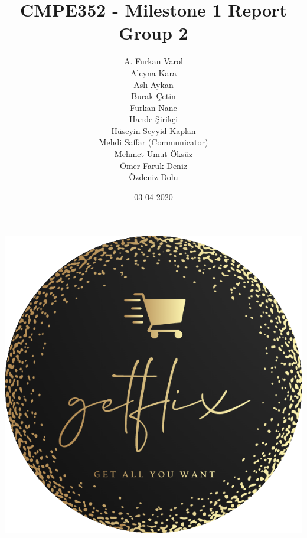 \documentclass[]{article}
\title{CMPE352 - Milestone 1 Report \\ Group 2}
\author{A. Furkan Varol \\ Aleyna Kara \\ Aslı Aykan
    \\ Burak Çetin \\ Furkan Nane \\ Hande Şirikçi
    \\ Hüseyin Seyyid Kaplan \\ Mehdi Saffar (Communicator) \\ Mehmet Umut Öksüz
    \\ Ömer Faruk Deniz \\ Özdeniz Dolu}
\date{03-04-2020}
\begin{document}
\makeatletter
\begin{titlepage}
    \begin{center}
        \includegraphics{logo_circle.png}\\[3ex] \leavevmode \\
        {\huge \bfseries \@title}\\[2ex]
        {\large \@author}\\[2ex]
        {\large \@date}
    \end{center}
\end{titlepage}
\makeatother
\thispagestyle{empty}
\newpage

{
    \setcounter{tocdepth}{2}
    \tableofcontents
    \pagebreak
}


\end{document}
